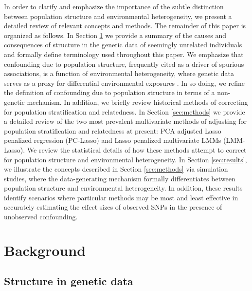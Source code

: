 In order to clarify and emphasize the importance of the subtle distinction between population structure and environmental heterogeneity, we present a detailed review of relevant concepts and methods. The remainder of this paper is organized as follows. In Section \ref{sec:background} we provide a summary of the causes and consequences of structure in the genetic data of seemingly unrelated individuals and formally define terminology used throughout this paper. We emphasize that confounding due to population structure, frequently cited as a driver of spurious associations, is a function of environmental heterogeneity, where genetic data serves as a proxy for differential environmental exposures \citep{Sillanpaeae2011, sul2018population, vilhjalmsson2012nature, barton2019population}. In so doing, we refine the definition of confounding due to population structure in terms of a non-genetic mechanism. In addition, we briefly review historical methods of correcting for population stratification and relatedness. In Section \ref{sec:methods} we provide a detailed review of the two most prevalent multivariate methods of adjusting for population stratification and relatedness at present: PCA adjusted Lasso penalized regression (PC-Lasso) and Lasso penalized multivariate LMMs (LMM-Lasso). We review the statistical details of how these methods attempt to correct for population structure and environmental heterogeneity. In Section \ref{sec:results}, we illustrate the concepts described in Section \ref{sec:methods} via simulation studies, where the data-generating mechanism formally differentiates between population structure and environmental heterogeneity. In addition, these results identify scenarios where particular methods may be most and least effective in accurately estimating the effect sizes of observed SNPs in the presence of unobserved confounding.




\section{Background} \label{sec:background}

\subsection{Structure in genetic data}

